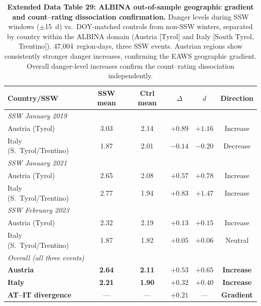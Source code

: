 \documentclass[11pt,letterpaper]{article}
\begin{document}
\begin{table}[htbp]
\caption{\textbf{Extended Data Table 29: ALBINA out-of-sample geographic gradient and count--rating dissociation confirmation.}
Danger levels during SSW windows ($\pm$15~d) vs.\ DOY-matched controls from non-SSW winters, separated by country within the ALBINA domain (Austria [Tyrol] and Italy [South Tyrol, Trentino]). 47,004~region-days, three SSW events. Austrian regions show consistently stronger danger increases, confirming the EAWS geographic gradient. Overall danger-level increases confirm the count--rating dissociation independently.}
\label{tab:albina_expanded}
\small
\begin{tabular}{lccccc}
\toprule
Country/SSW & SSW mean & Ctrl mean & $\Delta$ & $d$ & Direction \\
\midrule
\multicolumn{6}{l}{\textit{SSW January 2019}} \\
Austria (Tyrol) & 3.03 & 2.14 & $+0.89$ & $+1.16$ & Increase \\
Italy (S.\ Tyrol/Trentino) & 1.87 & 2.01 & $-0.14$ & $-0.20$ & Decrease \\
\midrule
\multicolumn{6}{l}{\textit{SSW January 2021}} \\
Austria (Tyrol) & 2.65 & 2.08 & $+0.57$ & $+0.78$ & Increase \\
Italy (S.\ Tyrol/Trentino) & 2.77 & 1.94 & $+0.83$ & $+1.47$ & Increase \\
\midrule
\multicolumn{6}{l}{\textit{SSW February 2023}} \\
Austria (Tyrol) & 2.32 & 2.19 & $+0.13$ & $+0.15$ & Increase \\
Italy (S.\ Tyrol/Trentino) & 1.87 & 1.82 & $+0.05$ & $+0.06$ & Neutral \\
\midrule
\multicolumn{6}{l}{\textit{Overall (all three events)}} \\
\textbf{Austria} & \textbf{2.64} & \textbf{2.11} & $\mathbf{+0.53}$ & $\mathbf{+0.65}$ & \textbf{Increase} \\
\textbf{Italy} & \textbf{2.21} & \textbf{1.90} & $\mathbf{+0.32}$ & $\mathbf{+0.40}$ & \textbf{Increase} \\
\midrule
\textbf{AT--IT divergence} & --- & --- & $\mathbf{+0.21}$ & --- & \textbf{Gradient} \\
\bottomrule
\end{tabular}
\end{table}
\end{document}
